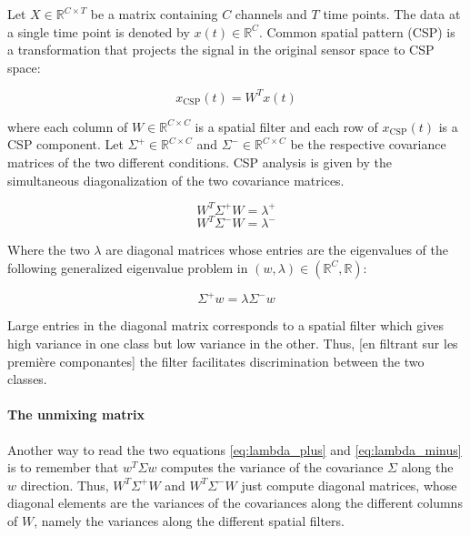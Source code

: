 Let $X \in \mathbb{R}^{C \times T}$ be a matrix containing $C$ channels and $T$ time points. The data at a single time point is denoted by $x(t) \in  \mathbb{R}^{C}$. Common spatial pattern (CSP) is a transformation that projects the signal in the original sensor space to CSP space:

\begin{equation}
    x_{\text{CSP}}(t) = W^{T}x(t)
\end{equation}

where each column of $W \in \mathbb{R}^{C  \times C}$ is a spatial filter and each row of $x_{\text{CSP}}(t)$ is a CSP component. Let $\Sigma^{+} \in \mathbb{R}^{C  \times C}$ and $\Sigma^{-} \in \mathbb{R}^{C  \times C}$ be the respective covariance matrices of the two different conditions. CSP analysis is given by the simultaneous diagonalization of the two covariance matrices.


\begin{equation}
    W^{T} \Sigma^{+} W = \lambda^{+}
    \label{eq:lambda_plus}
\end{equation}
\begin{equation}
    W^{T} \Sigma^{-} W = \lambda^{-}
    \label{eq:lambda_minus}
\end{equation}

Where the two $\lambda$ are diagonal matrices whose entries are the eigenvalues of the following generalized eigenvalue problem in $(w, \lambda) \in (\mathbb{R}^{C}, \mathbb{R})$:

\begin{equation}
    \Sigma^{+} w = \lambda \Sigma^{-} w
    \label{eq:general_eigenvalue}
\end{equation}

Large entries in the diagonal matrix corresponds to a spatial filter which gives high variance in one class but low variance in the other. Thus, [en filtrant sur les première componantes] the filter facilitates discrimination between the two classes.

\paragraph{The unmixing matrix}

Another way to read the two equations \ref{eq:lambda_plus} and \ref{eq:lambda_minus} is to remember that $w^{T}\Sigma w$ computes the variance of the covariance $\Sigma$ along the $w$ direction. Thus, $W^{T} \Sigma^{+} W$ and $W^{T} \Sigma^{-} W$ just compute diagonal matrices, whose diagonal elements are the variances of the covariances along the different columns of $W$, namely the variances along the different spatial filters.

